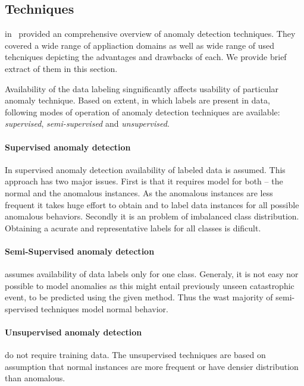 \subsection{Techniques}\label{subsec:anomtech}

 in~\cite{chandola2009anomaly} provided an comprehensive overview of anomaly detection
techniques. They covered a wide range of appliaction domains as well as wide range of used tehcniques 
depicting the advantages and drawbacks of each. We provide brief extract of them in this section. 

Availability of the data labeling singnificantly affects usability of particular anomaly technique. 
Based on extent, in which labels are present in data, following modes of operation of anomaly detection 
techniques are available: \emph{supervised}, \emph{semi-supervised} and \emph{unsupervised}.

\paragraph*{Supervised anomaly detection} In supervised anomaly detection
availability of labeled data is assumed.
This approach has two major issues. First is that it requires model for both -- the normal
and the anomalous instances. As the anomalous instances are less frequent it takes huge effort to 
obtain and to label data instances for all possible anomalous behaviors. 
Secondly it is an problem of imbalanced class distribution.
Obtaining a acurate and representative labels for all classes  is dificult.

\paragraph*{Semi-Supervised anomaly detection} assumes availability of data labels only for one class. 
Generaly, it is not easy nor possible to model anomalies as this might entail previously unseen 
catastrophic event, to be predicted using the given method.
Thus the wast majority of {semi-spervised} techniques model normal behavior.

\paragraph*{Unsupervised anomaly detection} do not require training data. The unsupervised 
techniques are based on assumption that normal instances are more frequent or have densier distribution
than anomalous.	


